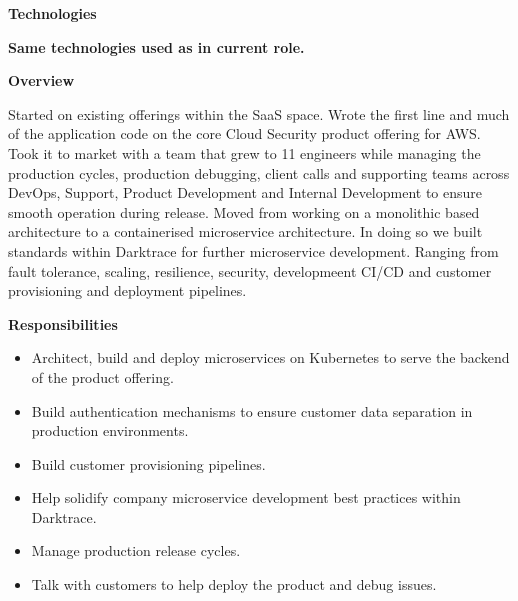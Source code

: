 \documentclass[10pt,a4paper]{altacv}
\begin{document}

\divider
\textbf{Technologies}

{\faExclamation}{   \textbf{Same technologies used as in current role.}}

\divider


\textbf{Overview}

Started on existing offerings within the SaaS space. Wrote the first line and much of the application code on the core Cloud Security product offering for AWS. Took it to market with a team that grew to 11 engineers while managing the production cycles, production debugging, client calls and supporting teams across DevOps, Support, Product Development and Internal Development to ensure smooth operation during release.
\newline
\newline
Moved from working on a monolithic based architecture to a containerised microservice architecture. In doing so we built standards within Darktrace for further microservice development. Ranging from fault tolerance, scaling, resilience, security, developmeent CI/CD and customer provisioning and deployment pipelines.

\divider
\textbf{Responsibilities}

\begin{itemize}
\item Architect, build and deploy microservices on Kubernetes to serve the backend of the product offering.
\item Build authentication mechanisms to ensure customer data separation in production environments.
\item Build customer provisioning pipelines.
\item Help solidify company microservice development best practices within Darktrace.
\item Manage production release cycles.
\item Talk with customers to help deploy the product and debug issues.
\end{itemize}
\divider
  
\end{document}
